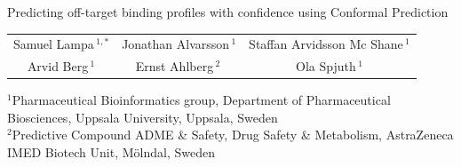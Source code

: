\documentclass[10pt,article]{memoir}
\begin{document}
\begin{center}
{\LARGE\noindent Predicting off-target binding profiles with confidence using Conformal
Prediction}
\end{center}

\begin{center}
\noindent
\begin{tabular}{ccc}
Samuel Lampa\,$^{1,*}$  & Jonathan Alvarsson\,$^{1}$ &  Staffan Arvidsson Mc Shane\,$^{1}$ \\
 Arvid Berg\,$^{1}$ &Ernst Ahlberg\,$^{2}$\, & Ola Spjuth\,$^{1}$ \\
\end{tabular}
\end{center}

\noindent
\begin{minipage}{1.1\textwidth}
\noindent\footnotesize $^1$Pharmaceutical Bioinformatics group, Department of Pharmaceutical Biosciences, Uppsala University, Uppsala, Sweden \\ 
\noindent\footnotesize $^2$Predictive Compound ADME \& Safety, Drug Safety \& Metabolism, AstraZeneca IMED Biotech Unit, Mölndal, Sweden \\ 
\end{minipage}


\def\keyFont{\fontsize{8}{11}\helveticabold }
\def\firstAuthorLast{Lampa {et~al.}} %
\def\Authors{Samuel Lampa\,$^{1,*}$, Jonathan Alvarsson\,$^{1}$, Staffan Arvidsson Mc Shane\,$^{1}$, Arvid Berg\,$^{1}$, Ernst Ahlberg\,$^{2}$  and Ola Spjuth\,$^{1}$}
\def\Address{$^{1}$Pharmaceutical Bioinformatics group, Department of Pharmaceutical Biosciences, Uppsala University, Uppsala, Sweden\\
$^{2}$Predictive Compound ADME \& Safety, Drug Safety \& Metabolism, AstraZeneca IMED Biotech Unit, M"olndal, Sweden}
\def\corrAuthor{Corresponding Author}

\def\corrEmail{samuel.lampa@farmbio.uu.se}
\end{document}
